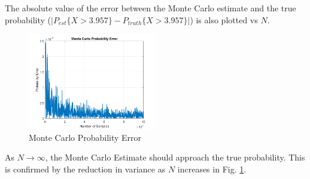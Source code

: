 \documentclass[conference]{IEEEtran}
\begin{document}
\noindent
The absolute value of the error between the Monte Carlo estimate and the true probability ($|P_{est}\{X > 3.957\} - P_{truth}\{X > 3.957\}|$) is also plotted vs $N$.
\begin{figure}[H]
\centerline{\includegraphics[width=0.5\textwidth]{Monte_Carlo_Error.png}}
\caption{Monte Carlo Probability Error}
\label{Monte Carlo Perr}
\end{figure}
As $N\rightarrow\infty$, the Monte Carlo Estimate should approach the true probability. This is confirmed by the reduction in variance as $N$ increases in Fig. \ref{Monte Carlo Perr}.
\end{document}
